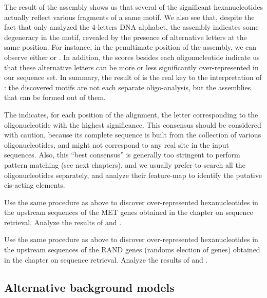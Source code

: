 The result of the assembly shows us that several of the significant
hexanucleotides actually reflect various fragments of a same motif.  We
also see that, despite the fact that  only
analyzed the 4-letters DNA alphabet, the assembly indicates some
degeneracy in the motif, revealed by the presence of alternative
letters at the same position. For instance, in the penultimate
position of the assembly, we can observe either  or . In
addition, the scores besides each oligonucleotide indicate us that
these alternative letters can be more or less significantly
over-represented in our sequence set. In summary, the result of
 is the real key to the interpretation of
: the discovered motifs are not each separate
oligo-analysis, but the assemblies that can be formed out of them.

The  indicates, for each position of the
alignment, the letter corresponding to the oligonucleotide with the
highest significance. This consensus should be considered with
caution, because its complete sequence is built from the collection of
various oligonucleotides, and might not correspond to any real site in
the input sequences. Also, this ``best consensus'' is generally too
stringent to perform pattern matching (see next chapters), and we
usually prefer to search all the oligonucleotides separately, and
analyze their feature-map to identify the putative cis-acting
elements.

\begin{exercise}
  Use the same procedure as above to discover over-represented
  hexanucleotides in the upstream sequences of the MET genes obtained
  in the chapter on sequence retrieval. Analyze the results of
   and .
\end{exercise}


\begin{exercise}
  Use the same procedure as above to discover over-represented
  hexanucleotides in the upstream sequences of the RAND genes (randoms
  election of genes) obtained in the chapter on sequence
  retrieval. Analyze the results of  and
  .
\end{exercise}


\subsection{Alternative background models}

